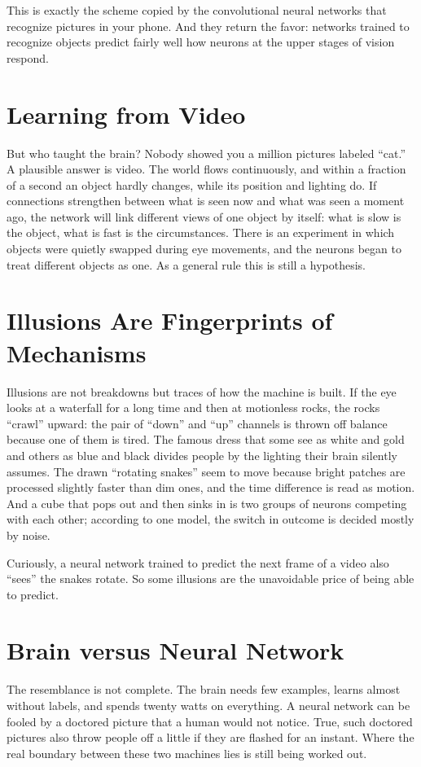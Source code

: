 This is exactly the scheme copied by the convolutional neural networks that recognize pictures in your phone. And they return the favor: networks trained to recognize objects predict fairly well how neurons at the upper stages of vision respond.

\section*{Learning from Video}

But who taught the brain? Nobody showed you a million pictures labeled ``cat.'' A plausible answer is video. The world flows continuously, and within a fraction of a second an object hardly changes, while its position and lighting do. If connections strengthen between what is seen now and what was seen a moment ago, the network will link different views of one object by itself: what is slow is the object, what is fast is the circumstances. There is an experiment in which objects were quietly swapped during eye movements, and the neurons began to treat different objects as one. As a general rule this is still a hypothesis.

\section*{Illusions Are Fingerprints of Mechanisms}

Illusions are not breakdowns but traces of how the machine is built. If the eye looks at a waterfall for a long time and then at motionless rocks, the rocks ``crawl'' upward: the pair of ``down'' and ``up'' channels is thrown off balance because one of them is tired. The famous dress that some see as white and gold and others as blue and black divides people by the lighting their brain silently assumes. The drawn ``rotating snakes'' seem to move because bright patches are processed slightly faster than dim ones, and the time difference is read as motion. And a cube that pops out and then sinks in is two groups of neurons competing with each other; according to one model, the switch in outcome is decided mostly by noise.

Curiously, a neural network trained to predict the next frame of a video also ``sees'' the snakes rotate. So some illusions are the unavoidable price of being able to predict.

\section*{Brain versus Neural Network}

The resemblance is not complete. The brain needs few examples, learns almost without labels, and spends twenty watts on everything. A neural network can be fooled by a doctored picture that a human would not notice. True, such doctored pictures also throw people off a little if they are flashed for an instant. Where the real boundary between these two machines lies is still being worked out.

